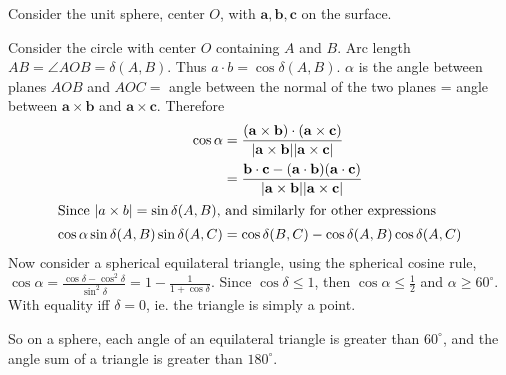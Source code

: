 \documentclass[a4paper]{article}
\begin{document}
Consider the unit sphere, center $O$, with $\mathbf{a, b, c}$ on the surface.

\begin{center}
\end{center}

Consider the circle with center $O$ containing $A$ and $B$. Arc length $AB = \angle AOB = \delta(A, B)$. Thus $a\cdot b = \cos \delta(A, B)$. $\alpha$ is the angle between planes $AOB$ and $AOC = $ angle between the normal of the two planes = angle between $\mathbf{a\times b}$ and $\mathbf{a \times c}$. Therefore
\begin{align*}
  \cos \alpha &= \mathbf{\frac{(a\times b)\cdot(a\times c)}{|a\times b||a\times c|}}\\
  &= \mathbf{\frac{b\cdot c - (a\cdot b)(a\cdot c)}{|a\times b||a\times c|}}\\
  \intertext{Since $|a\times b| = \sin\delta(A, B)$, and similarly for other expressions}
  \cos\alpha\sin\delta(A, B)\sin\delta(A, C) &= \cos\delta(B, C) - \cos\delta(A, B)\cos\delta(A, C)
\end{align*}
Now consider a spherical equilateral triangle, using the spherical cosine rule, $\cos\alpha = \frac{\cos\delta - \cos^2\delta}{\sin^2\delta} = 1 - \frac{1}{1 + \cos\delta}$. Since $\cos\delta\leq 1$, then $\cos\alpha\leq \frac{1}{2}$ and $\alpha \geq 60^\circ$. With equality iff $\delta = 0$, ie. the triangle is simply a point.

So on a sphere, each angle of an equilateral triangle is greater than $60^\circ$, and the angle sum of a triangle is greater than $180^\circ$.
\end{document}
